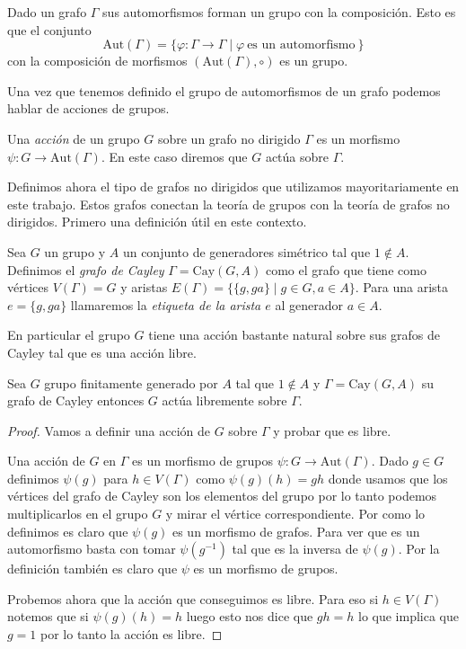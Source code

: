 \documentclass[tesis.tex]{subfiles}
\begin{document}
Dado un grafo $\Gamma$ sus automorfismos forman un grupo con la composición.
Esto es que el conjunto
\[
	\text{Aut}(\Gamma) = \{ \varphi: \Gamma \to \Gamma  \mid \varphi \ \text{es un automorfismo} \  \}
\]
con la composición de morfismos $(\text{Aut}(\Gamma), \circ)$ es un grupo.

Una vez que tenemos definido el grupo de automorfismos de un grafo podemos hablar de acciones de grupos.

\begin{deff}
	Una \emph{acción} de un grupo $G$ sobre un grafo no dirigido $\Gamma$ es un morfismo $\psi:G \to \text{Aut}(\Gamma)$.
	En este caso diremos que $G$ actúa sobre $\Gamma$.
\end{deff}




Definimos ahora el tipo de grafos no dirigidos que utilizamos mayoritariamente en este trabajo.
Estos grafos conectan la teoría de grupos con la teoría de grafos no dirigidos.
Primero una definición útil en este contexto.


\begin{deff}
	Sea $G$ un grupo y $A$ un conjunto de generadores simétrico tal que $1 \notin A$.
	Definimos el \emph{grafo de Cayley} $\Gamma = \text{Cay}(G,A)$ como el grafo que tiene como vértices $V(\Gamma) = G$ y aristas $E(\Gamma) = \{ \{g,ga \} \mid g \in G, a \in A \}$.
	Para una arista $e = \{g,ga\}$ llamaremos la \emph{etiqueta de la arista $e$} al generador $a \in A$.
\end{deff}


En particular el grupo $G$ tiene una acción bastante natural sobre sus grafos de Cayley tal que es una acción libre.

\begin{lema}\label{lema_grp_acc_libre_cayley}
	Sea $G$ grupo finitamente generado por $A$ tal que $1 \notin A$ y $\Gamma = \text{Cay}(G,A)$ su grafo de Cayley entonces $G$ actúa libremente sobre $\Gamma$.
\end{lema}

\begin{proof}
	Vamos a definir una acción de $G$ sobre $\Gamma$ y probar que es libre.
	
	Una acción de $G$ en $\Gamma$ es un morfismo de grupos $\psi: G \to \text{Aut}(\Gamma)$.
	Dado $g \in G$ definimos $\psi(g)$ para $h \in V(\Gamma)$ como $\psi(g)(h) = gh$ donde usamos que los vértices del grafo de Cayley son los elementos del grupo por lo tanto podemos multiplicarlos en el grupo $G$ y mirar el vértice correspondiente.
	Por como lo definimos es claro que $\psi(g)$ es un morfismo de grafos. 
	Para ver que es un automorfismo basta con tomar $\psi(g^{-1})$ tal que es la inversa de $\psi(g)$.
	Por la definición también es claro que $\psi$ es un morfismo de grupos.
	
	Probemos ahora que la acción que conseguimos es libre.
	Para eso si $h \in V(\Gamma)$ notemos que si $\psi(g)(h) = h$ luego esto nos dice que $gh = h$ lo que implica que $g = 1$ por lo tanto la acción es libre.
	
\end{proof}
\end{document}
